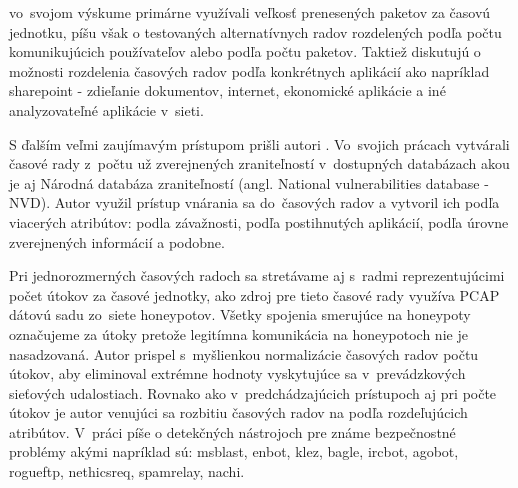 \documentclass[thesismargins, thesislinespacing, openright, upjsfrontpage]{rnthesis}
\begin{document}
\cite{jiang2004detecting} vo~svojom výskume primárne využívali veľkosť prenesených paketov za časovú jednotku, píšu však o testovaných alternatívnych radov rozdelených podľa počtu komunikujúcich používateľov alebo podľa počtu paketov. Taktiež diskutujú o možnosti rozdelenia časových radov podľa konkrétnych aplikácií ako napríklad sharepoint - zdieľanie dokumentov, internet, ekonomické aplikácie a iné analyzovateľné aplikácie v~sieti.

S ďalším veľmi zaujímavým prístupom prišli autori \cite{tang2016exploiting,roumani2015time,tang2018disclosure,tang2017big,pokhrel2017cybersecurity,werner2017time}. Vo~svojich prácach vytvárali časové rady z~počtu už zverejnených zraniteľností v~dostupných databázach akou je aj Národná databáza zraniteľností (angl. National vulnerabilities database - NVD). Autor \cite{roumani2015time} využil prístup vnárania sa do~časových radov a vytvoril ich podľa viacerých atribútov: podla závažnosti, podľa postihnutých aplikácií, podľa úrovne zverejnených informácií a podobne.

Pri jednorozmerných časových radoch sa stretávame aj s~radmi reprezentujúcimi počet útokov za časové jednotky, \cite{zhan2015predicting} ako zdroj pre tieto časové rady využíva PCAP dátovú sadu zo~siete honeypotov. Všetky spojenia smerujúce na honeypoty označujeme za útoky pretože legitímna komunikácia na honeypotoch nie je nasadzovaná. Autor \cite{fang2019deep} prispel s~myšlienkou normalizácie časových radov počtu útokov, aby eliminoval extrémne hodnoty vyskytujúce sa v~prevádzkových sieťových udalostiach. Rovnako ako v~predchádzajúcich prístupoch aj pri počte útokov je autor \cite{condon2008analysis} venujúci sa rozbitiu časových radov na podľa rozdeľujúcich atribútov. V~práci píše o detekčných nástrojoch pre známe bezpečnostné problémy akými napríklad sú: msblast, enbot, klez,  bagle, ircbot, agobot, rogueftp, nethicsreq, spamrelay, nachi.
\end{document}
